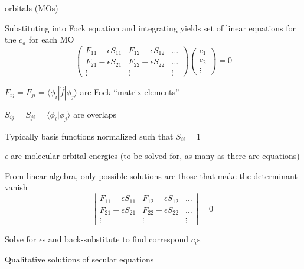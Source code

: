 \message{ !name(Outline.tex)}\documentclass[11pt]{article}
\begin{document}
\begin{outline}
\begin{outline}
\begin{outline}
       orbitals (MOs)
     \item Substituting into Fock equation and integrating yields set of linear
       equations for the $c_a$ for each MO
       \begin{displaymath}
         \left ( \begin{array}{ccc}
           F_{11}-\epsilon S_{11} & F_{12}-\epsilon S_{12} & \ldots \\
           F_{21}-\epsilon S_{21} & F_{22}-\epsilon S_{22} & \ldots \\
           \vdots & \vdots & \vdots
         \end{array} \right ) \left (
         \begin{array}{c}
           c_1 \\
           c_2 \\
           \vdots
         \end{array} \right ) = 0
     \end{displaymath}
     \begin{outline}
     \item $F_{ij} = F_{ji} = \langle \phi_i | \hat f | \phi_j \rangle$ are Fock
       ``matrix elements''
     \item $S_{ij} = S_{ji} = \langle \phi_i | \phi_j \rangle$ are overlaps
     \item Typically basis functions normalized such that $S_{ii} = 1$
     \item $\epsilon$ are molecular orbital energies (to be solved for, as many
       as there are equations)
     \end{outline}
   \item From linear algebra, only possible solutions are those that make the
     determinant vanish
       \begin{displaymath}
         \left | \begin{array}{ccc}
           F_{11}-\epsilon S_{11} & F_{12}-\epsilon S_{12} & \ldots \\
           F_{21}-\epsilon S_{21} & F_{22}-\epsilon S_{22} & \ldots \\
           \vdots & \vdots & \vdots
         \end{array} \right | = 0
     \end{displaymath}
   \item Solve for $\epsilon$s and back-substitute to find correspond $c_i$s
   \end{outline}
 \item Qualitative solutions of secular equations
   \begin{outline}

\end{outline}
\end{outline}
\end{outline}
\end{document}
